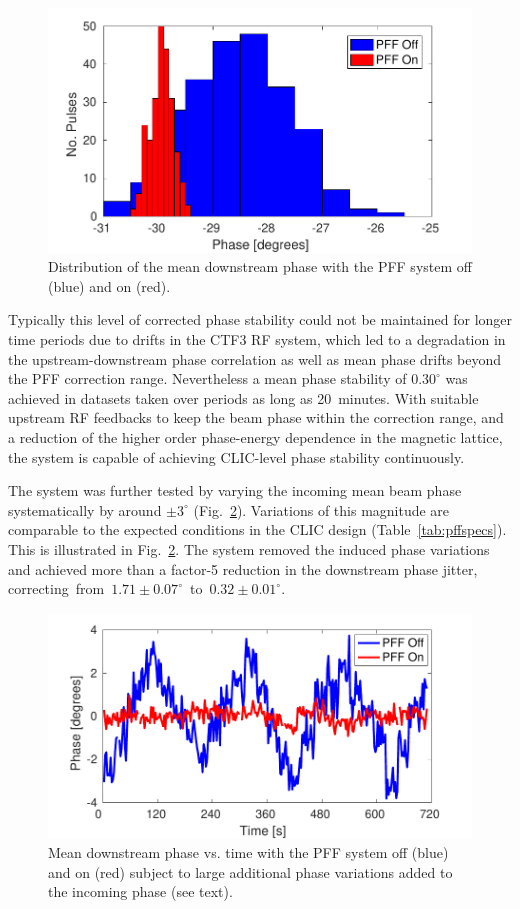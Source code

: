 \documentclass[%
 reprint,
 superscriptaddress,
 amsmath,
 amssymb,
 prl,
]{revtex4-1}
\begin{document}
\begin{figure}
	\includegraphics[width=\columnwidth]{figs/meanJit}
	\caption{\label{fig:meanJit}Distribution of the mean downstream phase with 
		the 
		PFF system off (blue) and on (red).}
\end{figure}

Typically this level of corrected phase stability could not be maintained for 
longer time periods due to drifts in the CTF3 RF system, which 
led to  a degradation in the upstream-downstream phase correlation as well as 
mean phase drifts beyond the PFF correction range. Nevertheless a mean phase 
stability of \(0.30^\circ\) was achieved in datasets taken over periods as long 
as 20~minutes. With suitable upstream RF feedbacks to keep the beam phase 
within the correction range, and a reduction of the higher order phase-energy 
dependence in the magnetic lattice, the system is capable of achieving 
CLIC-level phase stability continuously.

The system was further tested by varying the incoming mean 
beam phase systematically by around \(\pm 3^\circ\) (Fig.~\ref{fig:wiggle}). 
Variations of this magnitude 
are comparable to the expected conditions in the CLIC design 
(Table~\ref{tab:pffspecs}). This is illustrated in Fig.~\ref{fig:wiggle}. The 
system removed the induced phase variations and achieved more than a factor-5 
reduction in the downstream phase jitter, 
correcting~from~\(1.71\pm0.07^\circ\)~to~\(0.32\pm0.01^\circ\). 

\begin{figure}
	\includegraphics[width=\columnwidth]{figs/wiggle}
	\caption{\label{fig:wiggle}Mean downstream phase vs. time with the PFF 
	system off (blue) and on (red) subject to large additional phase variations 
	added to the incoming phase (see text).}
\end{figure}
\end{document}
